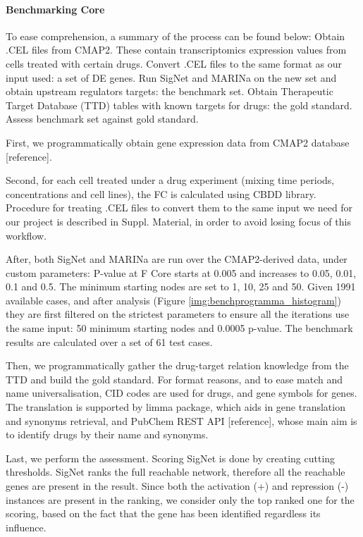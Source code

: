 \paragraph{Benchmarking Core}
To ease comprehension, a summary of the process can be found below:
Obtain .CEL files from CMAP2. These contain transcriptomics expression values from cells treated with certain drugs.
Convert .CEL files to the same format as our input used: a set of DE genes.
Run SigNet and MARINa on the new set and obtain upstream regulators targets: the benchmark set.
Obtain Therapeutic Target Database (TTD) tables with known targets for drugs: the gold standard.
Assess benchmark set against gold standard.

First, we programmatically obtain gene expression data from CMAP2 database [reference]. 

Second, for each cell treated under a drug experiment (mixing time periods, concentrations and cell lines), the FC is calculated using CBDD library. Procedure for treating .CEL files to convert them to the same input we need for our project is described in Suppl. Material, in order to avoid losing focus of this workflow.

After, both SigNet and MARINa are run over the CMAP2-derived data, under custom parameters: P-value at F Core starts at 0.005 and increases to 0.05, 0.01, 0.1 and 0.5. The minimum starting nodes are set to 1, 10, 25 and 50. Given 1991 available cases, and after analysis (Figure \ref{img:benchprogramma_histogram}) they are first filtered on the strictest parameters to ensure all the iterations use the same input: 50 minimum starting nodes and 0.0005 p-value. The benchmark results are calculated over a set of 61 test cases.

Then, we programmatically gather the drug-target relation knowledge from the TTD and build the gold standard. For format reasons, and to ease match and name universalisation, CID codes are used for drugs, and gene symbols for genes. The translation is supported by limma package, which aids in gene translation and synonyms retrieval, and PubChem REST API [reference], whose main aim is to identify drugs by their name and synonyms.

Last, we perform the assessment. Scoring SigNet is done by creating cutting thresholds. SigNet ranks the full reachable network, therefore all the reachable genes are present in the result. Since both the activation (+) and repression (-) instances are present in the ranking, we consider only the top ranked one for the scoring, based on the fact that the gene has been identified regardless its influence.

